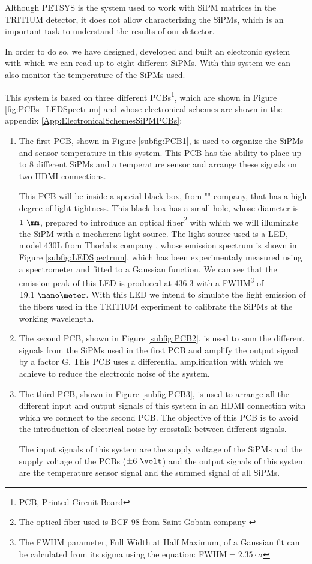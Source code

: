 Although PETSYS is the system used to work with SiPM matrices in the TRITIUM detector, it does not allow characterizing the SiPMs, which is an important task to understand the results of our detector.

In order to do so, we have designed, developed and built an electronic system with which we can read up to eight different SiPMs. With this system we can also monitor the temperature of the SiPMs used.

This system is based on three different PCBs\footnote{PCB, Printed Circuit Board}, which are shown in Figure \ref{fig:PCBs_LEDSpectrum} and whose electronical schemes are shown in the appendix \ref{App:ElectronicalSchemesSiPMPCBs}:

\begin{enumerate}
\item{} The first PCB, shown in Figure \ref{subfig:PCB1}, is used to organize the SiPMs and sensor temperature in this system. This PCB has the ability to place up to 8 different SiPMs and a temperature sensor and arrange these signals on two HDMI connections.

This PCB will be inside a special black box, from "" company, that has a high degree of light tightness. This black box has a small hole, whose diameter is $1~\mm$, prepared to introduce an optical fiber\footnote{The optical fiber used is BCF-98 from Saint-Gobain company \cite{OpticalFibers}} with which we will illuminate the SiPM with a incoherent light source. The light source used is a LED, model 430L from Thorlabs company \cite{LEDThorlabs}, whose emission spectrum is shown in Figure \ref{subfig:LEDSpectrum}, which has been experimentaly measured using a spectrometer and fitted to a Gaussian function. We can see that the emission peak of this LED is produced at $436.3$ with a FWHM\footnote{The FWHM parameter, Full Width at Half Maximum, of a Gaussian fit can be calculated from its sigma using the equation: FWHM$=2.35 \cdot{} \sigma$} of $19.1~\nano\meter$. With this LED we intend to simulate the light emission of the fibers used in the TRITIUM experiment to calibrate the SiPMs at the working wavelength. 

\item{} The second PCB, shown in Figure \ref{subfig:PCB2}, is used to sum the different signals from the SiPMs used in the first PCB and amplify the output signal by a factor G. This PCB uses a differential amplification with which we achieve to reduce the electronic noise of the system.

\item{} The third PCB, shown in Figure \ref{subfig:PCB3}, is used to arrange all the different input and output signals of this system in an HDMI connection with which we connect to the second PCB. The objective of this PCB is to avoid the introduction of electrical noise by crosstalk between different signals.

The input signals of this system are the supply voltage of the SiPMs and the supply voltage of the PCBs ($\pm 6~\volt$) and the output signals of this system are the temperature sensor signal and the summed signal of all SiPMs. 

\end{enumerate}

